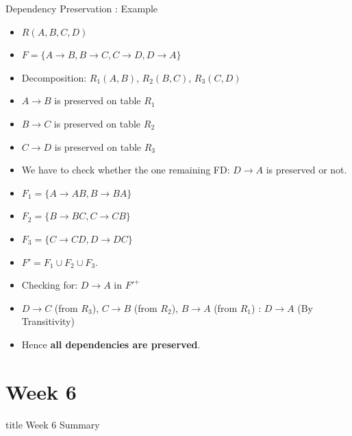 \documentclass[aspectratio=169, xcolor=dvipsnames]{beamer}
\begin{document}
\begin{frame}{Dependency Preservation : Example}
    \begin{itemize}[<+->]
        \item $R (A, B, C, D)$
        \item $F = \{A \rightarrow B, B \rightarrow C, C \rightarrow D, D \rightarrow A\}$
        \item Decomposition: $R_1 (A, B)$, $R_2 (B, C)$, $R_3 (C, D)$
        \item $A \rightarrow B$ is preserved on table $R_1$
        \item $B \rightarrow C$ is preserved on table $R_2$
        \item $C \rightarrow D$ is preserved on table $R_3$
        \item We have to check whether the one remaining FD: $D \rightarrow A$ is preserved or not.
        \item $F_1= \{A \rightarrow AB, B \rightarrow BA\}$
        \item $F_2= \{B \rightarrow BC, C \rightarrow CB\}$
        \item $F_3= \{C \rightarrow CD, D \rightarrow DC\}$
        \item $F' = F_1 \cup F_2 \cup F_3$.
        \item Checking for: $D \rightarrow A$ in ${F'}^+$
        \item $D \rightarrow C$ (from $R_3$), $C \rightarrow B$ (from $R_2$), $B \rightarrow A$ (from $R_1$) : $D \rightarrow A$ (By Transitivity)
        \item Hence \textbf{all dependencies are preserved}.
    \end{itemize}
\end{frame}

\section{Week 6}

\begin{frame}
  \vfill
  \centering
  \begin{beamercolorbox}[sep=8pt,center,shadow=true,rounded=true]{title}
    Week 6 Summary\par%
  \end{beamercolorbox}
  \vfill
\end{frame}
\end{document}
